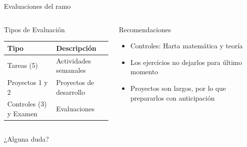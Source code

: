 \documentclass[
    10pt,
    aspectratio=169,
    xcolor={dvipsnames},
    spanish,
    ]{beamer}
\begin{document}
\begin{frame}{Evaluaciones del ramo}
\begin{columns}
  \begin{column}{0.5\textwidth}
    \begin{block}{Tipos de Evaluación}
      \begin{table}[h]
        \centering
        \footnotesize
        \begin{tabular}{|l|l|}
        \hline
        \textbf{Tipo} & \textbf{Descripción} \\
        \hline
        Tareas (5) & Actividades semanales \\
        \hline
        Proyectos 1 y 2 & Proyectos de desarrollo \\
        \hline
        Controles (3) y Examen & Evaluaciones  \\
        \hline
        \end{tabular}
      \end{table}
    \end{block}
  \end{column}
  
  \begin{column}{0.43\textwidth}
    \begin{alertblock}{Recomendaciones}
      \footnotesize
      \begin{itemize}
        \item Controles: Harta matemática y teoría
        \item Los ejercicios no dejarlos para último momento
        \item Proyectos son largos, por lo que prepararlos con anticipación
      \end{itemize}
    \end{alertblock}
  \end{column}
\end{columns}
\end{frame}

\begin{frame}{}
\begin{center}
\Huge ¿Alguna duda?
\end{center}
\end{frame}
\end{document}
